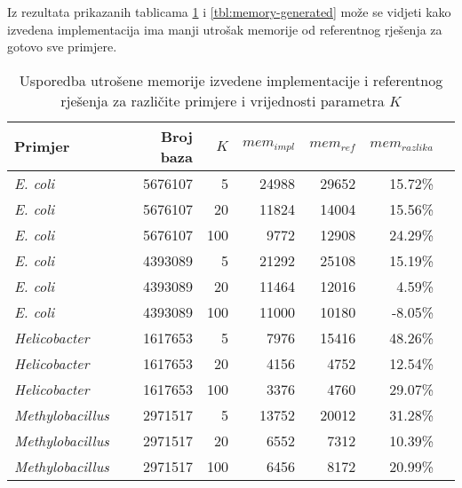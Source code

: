 \documentclass[times, utf8, seminar, numeric]{fer}
\begin{document}
Iz rezultata prikazanih tablicama \ref{tbl:memory-bacteria} i \ref{tbl:memory-generated} može se vidjeti kako izvedena implementacija ima manji utrošak memorije od referentnog rješenja za gotovo sve primjere.

\begin{table}[h]
	\centering
	\caption{Usporedba utrošene memorije izvedene implementacije i referentnog rješenja za različite primjere i vrijednosti parametra $K$}
	\label{tbl:memory-bacteria}
	
	\begin{tabular}{lrrrrrr}
		\hline
		Primjer & Broj baza & $K$ & $mem_{impl}$ & $mem_{ref}$ & $mem_{razlika}$ \\ \hline
        \textit{E. coli} & 5676107 & 5 & 24988 & 29652 & 15.72\% \\
        \textit{E. coli} & 5676107 & 20 & 11824 & 14004 & 15.56\% \\
        \textit{E. coli} & 5676107 & 100 & 9772 & 12908 & 24.29\% \\ \hline
        \textit{E. coli} & 4393089 & 5 & 21292 & 25108 & 15.19\% \\
        \textit{E. coli} & 4393089 & 20 & 11464 & 12016 & 4.59\% \\
        \textit{E. coli} & 4393089 & 100 & 11000 & 10180 & -8.05\% \\ \hline
        \textit{Helicobacter} & 1617653 & 5 & 7976 & 15416 & 48.26\% \\
        \textit{Helicobacter} & 1617653 & 20 & 4156 & 4752 & 12.54\% \\
        \textit{Helicobacter} & 1617653 & 100 & 3376 & 4760 & 29.07\% \\ \hline
        \textit{Methylobacillus} & 2971517 & 5 & 13752 & 20012 & 31.28\% \\
        \textit{Methylobacillus} & 2971517 & 20 & 6552 & 7312 & 10.39\% \\
        \textit{Methylobacillus} & 2971517 & 100 & 6456 & 8172 & 20.99\% \\
    \hline
	\end{tabular}
\end{table}
\end{document}
